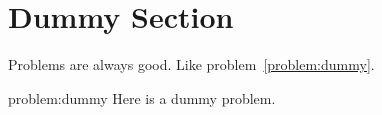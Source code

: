 \section{Dummy Section}

Problems are always good.
Like problem~\ref{problem:dummy}.

\begin{problem}[Dummy...]{problem:dummy}
Here is a dummy problem.
\end{problem}
